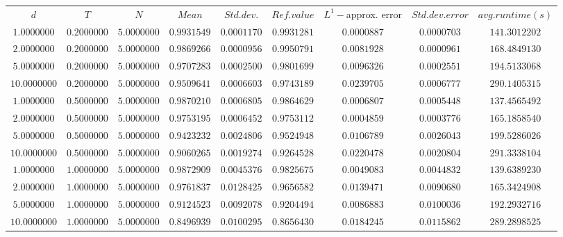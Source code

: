 \begin{tabular}{ccccccccc}
$d$ & $T$ & $N$ & $Mean$ & $Std. dev.$ & $Ref. value$ & $L^1-$approx. error & $Std. dev. error$ & $avg. runtime (s)$\\
$1.0000000$ & $0.2000000$ & $5.0000000$ & $0.9931549$ & $0.0001170$ & $0.9931281$ & $0.0000887$ & $0.0000703$ & $141.3012202$\\
$2.0000000$ & $0.2000000$ & $5.0000000$ & $0.9869266$ & $0.0000956$ & $0.9950791$ & $0.0081928$ & $0.0000961$ & $168.4849130$\\
$5.0000000$ & $0.2000000$ & $5.0000000$ & $0.9707283$ & $0.0002500$ & $0.9801699$ & $0.0096326$ & $0.0002551$ & $194.5133068$\\
$10.0000000$ & $0.2000000$ & $5.0000000$ & $0.9509641$ & $0.0006603$ & $0.9743189$ & $0.0239705$ & $0.0006777$ & $290.1405315$\\
$1.0000000$ & $0.5000000$ & $5.0000000$ & $0.9870210$ & $0.0006805$ & $0.9864629$ & $0.0006807$ & $0.0005448$ & $137.4565492$\\
$2.0000000$ & $0.5000000$ & $5.0000000$ & $0.9753195$ & $0.0006452$ & $0.9753112$ & $0.0004859$ & $0.0003776$ & $165.1858540$\\
$5.0000000$ & $0.5000000$ & $5.0000000$ & $0.9423232$ & $0.0024806$ & $0.9524948$ & $0.0106789$ & $0.0026043$ & $199.5286026$\\
$10.0000000$ & $0.5000000$ & $5.0000000$ & $0.9060265$ & $0.0019274$ & $0.9264528$ & $0.0220478$ & $0.0020804$ & $291.3338104$\\
$1.0000000$ & $1.0000000$ & $5.0000000$ & $0.9872909$ & $0.0045376$ & $0.9825675$ & $0.0049083$ & $0.0044832$ & $139.6389230$\\
$2.0000000$ & $1.0000000$ & $5.0000000$ & $0.9761837$ & $0.0128425$ & $0.9656582$ & $0.0139471$ & $0.0090680$ & $165.3424908$\\
$5.0000000$ & $1.0000000$ & $5.0000000$ & $0.9124523$ & $0.0092078$ & $0.9204494$ & $0.0086883$ & $0.0100036$ & $192.2932716$\\
$10.0000000$ & $1.0000000$ & $5.0000000$ & $0.8496939$ & $0.0100295$ & $0.8656430$ & $0.0184245$ & $0.0115862$ & $289.2898525$\\
\end{tabular}
